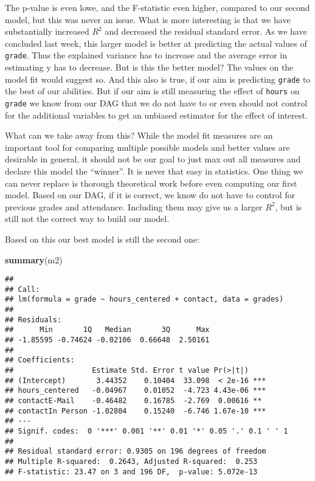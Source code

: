 \documentclass[
]{book}
\newenvironment{Shaded}{\begin{snugshade}}{\end{snugshade}}
\newcommand{\FunctionTok}[1]{\textcolor[rgb]{0.13,0.29,0.53}{\textbf{#1}}}
\newcommand{\NormalTok}[1]{#1}
\begin{document}
The p-value is even lowe, and the F-statistic even higher, compared to our
second model, but this was never an issue. What is more interesting is that we
have substantially increased \(R^2\) and decreased the residual standard error.
As we have concluded last week, this larger model is better at predicting the
actual values of \texttt{grade}. Thus the explained variance has to increase and the
average error in estimating y has to decrease. But is this the better model? The
values on the model fit would suggest so. And this also is true, if our aim is
predicting \texttt{grade} to the best of our abilities. But if our aim is still
measuring the effect of \texttt{hours} on \texttt{grade} we know from our DAG that we do not
have to or even should not control for the additional variables to get an
unbiased estimator for the effect of interest.

What can we take away from this? While the model fit measures are an important
tool for comparing multiple possible models and better values are desirable in
general, it should not be our goal to just max out all measures and declare this
model the ``winner''. It is never that easy in statistics.
One thing we can never replace is thorough theoretical work before even
computing our first model. Based on our DAG, if it is correct, we know do not
have to control for previous grades and attendance. Including them may give us a
larger \(R^2\), but is still not the correct way to build our model.

Based on this our best model is still the second one:

\begin{Shaded}
\begin{Highlighting}[]
\FunctionTok{summary}\NormalTok{(m2)}
\end{Highlighting}
\end{Shaded}

\begin{verbatim}
## 
## Call:
## lm(formula = grade ~ hours_centered + contact, data = grades)
## 
## Residuals:
##      Min       1Q   Median       3Q      Max 
## -1.85595 -0.74624 -0.02106  0.66648  2.50161 
## 
## Coefficients:
##                  Estimate Std. Error t value Pr(>|t|)    
## (Intercept)       3.44352    0.10404  33.098  < 2e-16 ***
## hours_centered   -0.04967    0.01052  -4.723 4.43e-06 ***
## contactE-Mail    -0.46482    0.16785  -2.769  0.00616 ** 
## contactIn Person -1.02804    0.15240  -6.746 1.67e-10 ***
## ---
## Signif. codes:  0 '***' 0.001 '**' 0.01 '*' 0.05 '.' 0.1 ' ' 1
## 
## Residual standard error: 0.9305 on 196 degrees of freedom
## Multiple R-squared:  0.2643, Adjusted R-squared:  0.253 
## F-statistic: 23.47 on 3 and 196 DF,  p-value: 5.072e-13
\end{verbatim}
\end{document}

